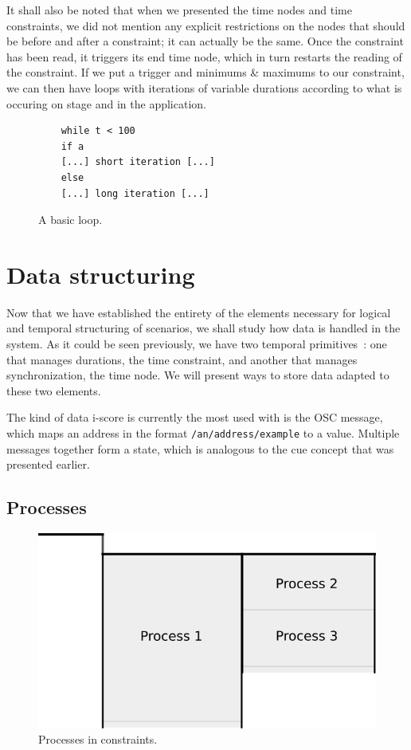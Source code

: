 \documentclass{sigchi}
\begin{document}
It shall also be noted that when we presented the time nodes and time constraints, we did not mention any explicit restrictions on the nodes that should be before and after a constraint; it can actually be the same. Once the constraint has been read, it triggers its end time node, which in turn restarts the reading of the constraint. If we put a trigger and minimums \& maximums to our constraint, we can then have loops with iterations of variable durations according to what is occuring on stage and in the application.

\begin{figure}
	\centering
	\begin{lstlisting}
	while t < 100
	if a
	[...] short iteration [...]
	else
	[...] long iteration [...]           
	\end{lstlisting}
	\caption{A basic loop.}	
	\label{fig.loopcode}
\end{figure}

\section{Data structuring}
Now that we have established the entirety of the elements necessary for logical and temporal structuring of scenarios, we shall study how data is handled in the system.
As it could be seen previously, we have two temporal primitives~: one that manages durations, the time constraint, and another that manages synchronization, the time node. We will present ways to store data adapted to these two elements.

The kind of data i-score is currently the most used with is the OSC message, which maps an address in the format \texttt{/an/address/example} to a value. Multiple messages together form a state, which is analogous to the cue concept that was presented earlier.

\subsection{Processes}

\begin{figure}[h]
    \centering
    \includegraphics[scale=0.5]{images/processes.png}
    \caption{Processes in constraints.}
    \label{fig.processes} 
\end{figure}
\end{document}
